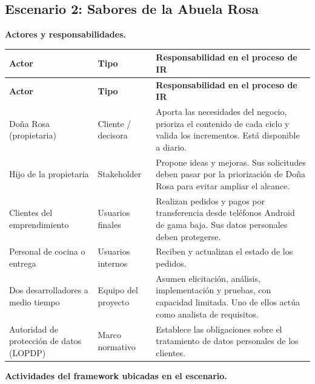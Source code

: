 \subsection{Escenario 2: Sabores de la Abuela Rosa}

\textbf{Actores y responsabilidades.}

{\small
\setlength{\tabcolsep}{4pt}
\renewcommand{\arraystretch}{1.3}
\begin{longtable}{
|>{\raggedright\arraybackslash}p{}
|>{\raggedright\arraybackslash}p{}
|>{\raggedright\arraybackslash}p{}|}
\hline
\textbf{Actor} & \textbf{Tipo} & \textbf{Responsabilidad en el proceso de IR} \\
\hline
\endfirsthead
\hline
\textbf{Actor} & \textbf{Tipo} & \textbf{Responsabilidad en el proceso de IR} \\
\hline
\endhead
Doña Rosa (propietaria) & Cliente / decisora & Aporta las necesidades del negocio, prioriza el contenido de cada ciclo y valida los incrementos. Está disponible a diario. \\
\hline
Hijo de la propietaria & Stakeholder & Propone ideas y mejoras. Sus solicitudes deben pasar por la priorización de Doña Rosa para evitar ampliar el alcance. \\
\hline
Clientes del emprendimiento & Usuarios finales & Realizan pedidos y pagos por transferencia desde teléfonos Android de gama baja. Sus datos personales deben protegerse. \\
\hline
Personal de cocina o entrega & Usuarios internos & Reciben y actualizan el estado de los pedidos. \\
\hline
Dos desarrolladores a medio tiempo & Equipo del proyecto & Asumen elicitación, análisis, implementación y pruebas, con capacidad limitada. Uno de ellos actúa como analista de requisitos. \\
\hline
Autoridad de protección de datos (LOPDP) & Marco normativo & Establece las obligaciones sobre el tratamiento de datos personales de los clientes. \\
\hline
\end{longtable}
}

\textbf{Actividades del framework ubicadas en el escenario.}

